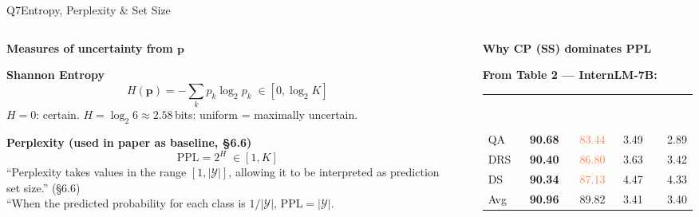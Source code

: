 \documentclass[aspectratio=169,10pt]{beamer}
\newcommand{\hruleslide}{%
  \vspace{0.15em}{\color{Rule}\hrule height 0.4pt}\vspace{0.3em}}
\newcommand{\thead}[1]{%
  \cellcolor{TblHead}\textcolor{white}{\textbf{\footnotesize #1}}}
\newcommand{\talt}{\rowcolor{TblAlt}}
\begin{document}
\begin{frame}{Q7\enspace Entropy, Perplexity \& Set Size}

\begin{columns}[T]
  \begin{column}{0.46\textwidth}
    {\small\bfseries\color{darkred}Measures of uncertainty from $\mathbf{p}$}
    \hruleslide

    \textbf{\footnotesize Shannon Entropy}
    \[H(\mathbf{p})=-\sum_k p_k\log_2 p_k\;\in[0,\log_2 K]\]
    {\footnotesize\color{Slate}$H=0$: certain. $H=\log_2 6\approx2.58$\,bits: uniform = maximally uncertain.}

    \vspace{0.5em}
    \textbf{\footnotesize Perplexity (used in paper as baseline, §6.6)}
    \[\mathrm{PPL}=2^H\;\in[1,K]\]
    {\footnotesize\color{Slate}
      ``Perplexity takes values in the range $[1,|\mathcal{Y}|]$, allowing it to be interpreted as prediction set size.'' (§6.6)\\[3pt]
      ``When the predicted probability for each class is $1/|\mathcal{Y}|$, $\mathrm{PPL}=|\mathcal{Y}|$.}

  \end{column}

  \begin{column}{0.02\textwidth}\color{Rule}\vrule\end{column}

  \begin{column}{0.46\textwidth}
    {\small\bfseries\color{darkred}Why CP (SS) dominates PPL}
    \hruleslide

    {\footnotesize\bfseries\color{darkred}From Table 2 — InternLM-7B:}
    \vspace{0.3em}

    \renewcommand{\arraystretch}{1.35}
    {\fontsize{7.5}{9.5}\selectfont
    \begin{tabular}{@{}lrrrr@{}}
    \thead{Task} & \thead{CR\,CP} & \thead{CR\,PPL} & \thead{SS\,CP} & \thead{SS\,PPL} \\
    \talt QA  & \textbf{90.68} & \textcolor{Coral}{83.44} & 3.49 & 2.89 \\
         DRS & \textbf{90.40} & \textcolor{Coral}{86.80} & 3.63 & 3.42 \\
    \talt DS  & \textbf{90.34} & \textcolor{Coral}{87.13} & 4.47 & 4.33 \\
         Avg & \textbf{90.96} & 89.82 & 3.41 & 3.40 \\
    \end{tabular}}


\end{column}
\end{columns}
\end{frame}
\end{document}
